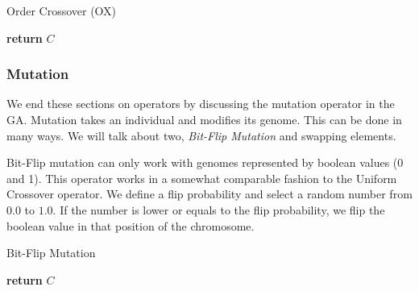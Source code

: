 \begin{algorithm}[H]
    \caption{Order Crossover (OX)}
    \label{theory-ga-ox}
    \begin{algorithmic}[1]
         
             
            \EndIf
             
             
                 
                     
                \EndWhile
                 
                \EndIf
            \EndFor
            \State \textbf{return} $C$
        \EndProcedure
    \end{algorithmic}
\end{algorithm}


\subsubsection{Mutation}

We end these sections on operators by discussing the mutation operator in the GA. Mutation takes an individual and modifies its genome. This can be done in many ways. We will talk about two, \textit{Bit-Flip Mutation} and swapping elements.

Bit-Flip mutation can only work with genomes represented by boolean values (0 and 1). This operator works in a somewhat comparable fashion to the Uniform Crossover operator. We define a flip probability and select a random number from $0.0$ to $1.0$. If the number is lower or equals to the flip probability, we flip the boolean value in that position of the chromosome.

\begin{algorithm}[H]
    \caption{Bit-Flip Mutation}
    \begin{algorithmic}[1]
                \EndIf
            \EndFor
            \State \textbf{return} $C$
        \EndProcedure
    \end{algorithmic}
\end{algorithm}

